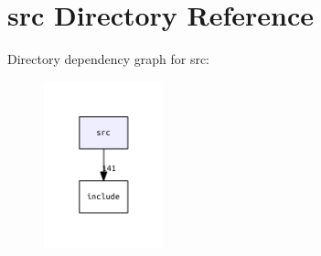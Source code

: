 \section{src Directory Reference}
\label{dir_68267d1309a1af8e8297ef4c3efbcdba}
Directory dependency graph for src\+:\nopagebreak
\begin{figure}[H]
\begin{center}
\leavevmode
\includegraphics[width=98pt]{dir_68267d1309a1af8e8297ef4c3efbcdba_dep}
\end{center}
\end{figure}

